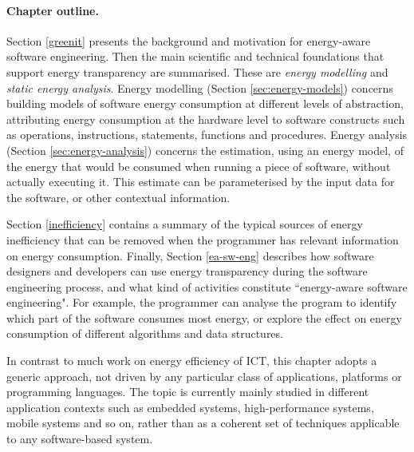 \documentclass[oneside]{book}
\begin{document}
\paragraph{Chapter outline.}  Section \ref{greenit} presents the background and motivation for energy-aware software engineering. Then  the main scientific and technical foundations that support energy transparency are summarised.  These are \emph{energy modelling} and \emph{static energy analysis}. Energy modelling (Section \ref{sec:energy-models}) concerns building models of software energy consumption at different levels of abstraction, attributing energy consumption at the hardware level to software constructs such as operations, instructions, statements, functions and
procedures.   Energy analysis (Section \ref{sec:energy-analysis}) concerns the estimation, using an energy model, of the energy that would be consumed when running a piece of software, without actually executing it.  This estimate can be parameterised by the input data for the software, or other contextual information. 

Section \ref{inefficiency} contains a summary of the typical sources of energy inefficiency that can be removed when the programmer has relevant information on energy consumption.   Finally, Section \ref{ea-sw-eng} describes how software designers and developers can use energy transparency during the software engineering process, and what kind of activities constitute ``energy-aware software engineering".  For example, the programmer can analyse the program to identify which part of the software consumes most energy, or explore the effect on
energy consumption of different algorithms and data structures.

In contrast to much work on energy efficiency of ICT, this chapter adopts a generic approach, not driven by any particular class of applications, platforms or programming languages. The topic is currently mainly studied in different application contexts such as embedded systems, high-performance systems, mobile systems and so on, rather than as a coherent set of techniques applicable to any software-based system.

\nopagebreak
\end{document}

